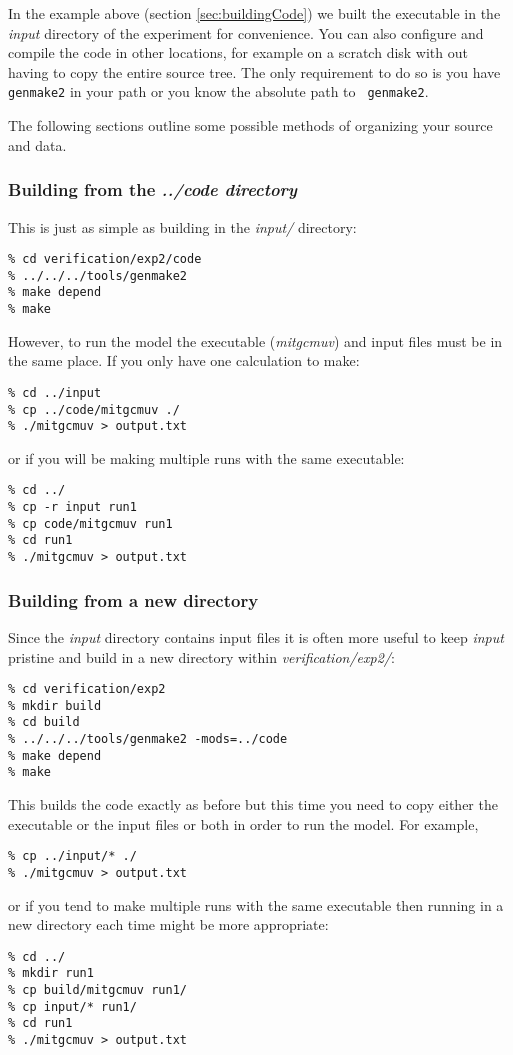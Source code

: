 In the example above (section \ref{sec:buildingCode}) we built the
executable in the {\em input} directory of the experiment for
convenience. You can also configure and compile the code in other
locations, for example on a scratch disk with out having to copy the
entire source tree. The only requirement to do so is you have {\tt
  genmake2} in your path or you know the absolute path to {\tt
  genmake2}.

The following sections outline some possible methods of organizing
your source and data.

\subsubsection{Building from the {\em ../code directory}}

This is just as simple as building in the {\em input/} directory:
\begin{verbatim}
% cd verification/exp2/code
% ../../../tools/genmake2
% make depend
% make
\end{verbatim}
However, to run the model the executable ({\em mitgcmuv}) and input
files must be in the same place. If you only have one calculation to make:
\begin{verbatim}
% cd ../input
% cp ../code/mitgcmuv ./
% ./mitgcmuv > output.txt
\end{verbatim}
or if you will be making multiple runs with the same executable:
\begin{verbatim}
% cd ../
% cp -r input run1
% cp code/mitgcmuv run1
% cd run1
% ./mitgcmuv > output.txt
\end{verbatim}

\subsubsection{Building from a new directory}

Since the {\em input} directory contains input files it is often more
useful to keep {\em input} pristine and build in a new directory
within {\em verification/exp2/}:
\begin{verbatim}
% cd verification/exp2
% mkdir build
% cd build
% ../../../tools/genmake2 -mods=../code
% make depend
% make
\end{verbatim}
This builds the code exactly as before but this time you need to copy
either the executable or the input files or both in order to run the
model. For example,
\begin{verbatim}
% cp ../input/* ./
% ./mitgcmuv > output.txt
\end{verbatim}
or if you tend to make multiple runs with the same executable then
running in a new directory each time might be more appropriate:
\begin{verbatim}
% cd ../
% mkdir run1
% cp build/mitgcmuv run1/
% cp input/* run1/
% cd run1
% ./mitgcmuv > output.txt
\end{verbatim}

